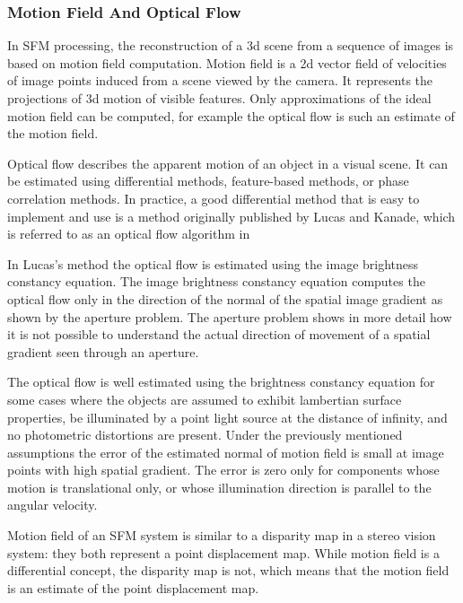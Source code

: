 \documentclass[12pt,a4paper,oneside,pdftex]{report}
\begin{document}
\subsubsection{Motion Field And Optical Flow}
\label{subsubsection:motion_field_and_optical_flow}

In SFM processing, the reconstruction of a 3d scene from a sequence of images is based on motion field computation. Motion field is a 2d vector field of velocities of image points induced from a scene viewed by the camera. It represents the projections of 3d motion of visible features. Only approximations of the ideal motion field can be computed, for example the optical flow is such an estimate of the motion field.

Optical flow describes the apparent motion of an object in a visual scene. It can be estimated using differential methods, feature-based methods, or phase correlation methods. In practice, a good differential method that is easy to implement and use is a method originally published by Lucas and Kanade, which is referred to as an optical flow algorithm in \citep{Trucco98, Lucas81}

In Lucas's method the optical flow is estimated using the image brightness constancy equation. The image brightness constancy equation computes the optical flow only in the direction of the normal of the spatial image gradient as shown by the aperture problem. The aperture problem shows in more detail how it is not possible to understand the actual direction of movement of a spatial gradient seen through an aperture.  

The optical flow is well estimated using the brightness constancy equation for some cases where the objects are assumed to exhibit lambertian surface properties, be illuminated by a point light source at the distance of infinity, and  no photometric distortions are present. Under the previously mentioned assumptions the error of the estimated normal of motion field is small at image points with high spatial gradient. The error is zero only for components whose motion is translational only, or whose illumination direction is parallel to the angular velocity. 

Motion field of an SFM system is similar to a disparity map in a stereo vision system: they both represent a point displacement map. While motion field is a differential concept, the disparity map is not, which means that the motion field is an estimate of the point displacement map.

\end{document}
